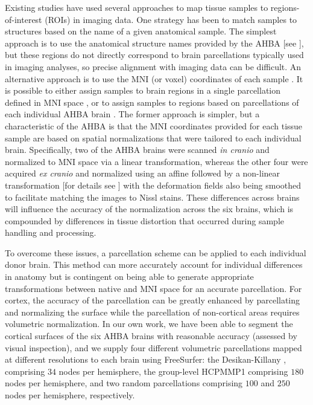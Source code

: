 Existing studies have used several approaches to map tissue samples to regions-of-interest (ROIs) in imaging data.
One strategy has been to match samples to structures based on the name of a given anatomical sample. The simplest approach is to use the anatomical structure names provided by the AHBA [see \citet{AHBAdoc,Tan2013,Myers2015a,Chen2016,Kirsch2016a,Hecker2017,Lee2017a,Negi2017}], but these regions do not directly correspond to brain parcellations typically used in imaging analyses, so precise alignment with imaging data can be difficult. An alternative approach is to use the MNI (or voxel) coordinates of each sample \citep{Goyal2014,Cioli2014b,French2015,Richiardi2015,Komorowski2016,Krienen2016,Rizzo2016,Burt2018,Parkes2017,Romme2017,Shin2017,Anderson2018,Romero-Garcia2018}.
It is possible to either assign samples to brain regions in a single parcellation defined in MNI space \citep{Krienen2016,Keo2017,Parkes2017,Romme2017}, or to assign samples to regions based on parcellations of each individual AHBA brain \citep{Romero-Garcia2018}. The former approach is simpler, but a characteristic of the AHBA is that the MNI coordinates provided for each tissue sample are based on spatial normalizations that were tailored to each individual brain. Specifically, two of the AHBA brains were scanned \textit{in cranio} and normalized to MNI space via a linear transformation, whereas the other four were acquired \textit{ex cranio} and normalized using an affine followed by a non-linear transformation [for details see \citep{AHBAdoc}] with the deformation fields also being smoothed to facilitate matching the images to Nissl stains. These differences across brains will influence the accuracy of the normalization across the six brains, which is compounded by differences in tissue distortion that occurred during sample handling and processing.

To overcome these issues, a parcellation scheme can be applied to each individual donor brain. This method can more accurately account for individual differences in anatomy but is contingent on being able to generate appropriate transformations between native and MNI space for an accurate parcellation. For cortex, the accuracy of the parcellation can be greatly enhanced by parcellating and normalizing the surface while the parcellation of non-cortical areas requires volumetric normalization. In our own work, we have been able to segment the cortical surfaces of the six AHBA brains with reasonable accuracy (assessed by visual inspection), and we supply four different volumetric parcellations mapped at different resolutions to each brain using FreeSurfer: the Desikan-Killany \citep{Desikan2006}, comprising $34$ nodes per hemisphere, the group-level HCPMMP1 \citep{Glasser2016} comprising $180$ nodes per hemisphere, and two random parcellations comprising $100$ and $250$ nodes per hemisphere, respectively.

